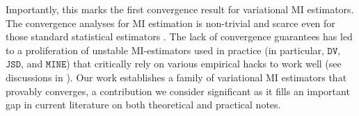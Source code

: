 \documentclass{article}
\theoremstyle{plain}
\theoremstyle{definition}
\theoremstyle{remark}
\newcommand{\DV}{\texttt{DV}}
\newcommand{\MINE}{\texttt{MINE}}
\renewcommand{\JSD}{\texttt{JSD}}
\begin{document}
		
		
		
		
		
		Importantly, this marks the first convergence result for variational MI estimators. The convergence analyses for MI estimation is non-trivial and scarce even for those standard statistical estimators \citep{paninski2003estimation, gao2015efficient, rainforth2018nesting}. The lack of convergence guarantees has led to a proliferation of unstable MI-estimators used in practice (in particular, $\DV$, $\JSD$, and  $\MINE$) that critically rely on various empirical hacks to work well (see discussions in \cite{song2020understanding}). Our work establishes a family of variational MI estimators that provably converges, a contribution we consider significant as it fills an important gap in current literature on both theoretical and practical notes.
		
		
		
		
		
\end{document}
